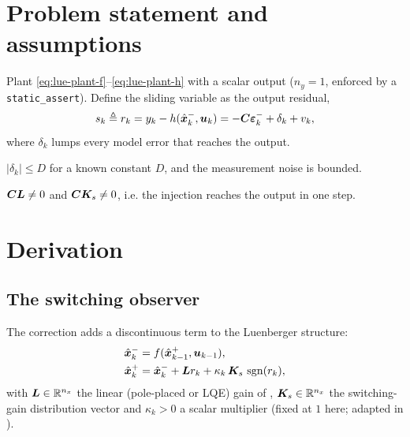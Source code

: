 \section{Problem statement and assumptions}
Plant \eqref{eq:lue-plant-f}--\eqref{eq:lue-plant-h} with a scalar output ($n_y=1$, enforced by a
\texttt{static\_assert}).  Define the sliding variable as the output residual,
\begin{equation}
s_k \triangleq r_k = y_k - h(\hat{\bm{x}}^{-}_k,\bm{u}_k) = -\bm{C}\bm{\varepsilon}^-_k + \delta_k + v_k ,
\label{eq:smo-s}
\end{equation}
where $\delta_k$ lumps every model error that reaches the output.
\begin{assumption}\label{as:smo-bound}
$|\delta_k| \le D$ for a known constant $D$, and the measurement noise is bounded.
\end{assumption}
\begin{assumption}\label{as:smo-reldeg}
$\bm{C}\bm{L} \neq 0$ and $\bm{C} \bm{K}_s \neq 0$, i.e. the injection reaches the output in one step.
\end{assumption}

\section{Derivation}

\subsection{The switching observer}
The correction adds a discontinuous term to the Luenberger structure:
\begin{align}
\hat{\bm{x}}^{-}_k &= f(\hat{\bm{x}}^{+}_{k-1},\bm{u}_{k-1}) , \label{eq:smo-pred}\\
\hat{\bm{x}}^{+}_k  &= \hat{\bm{x}}^{-}_k + \bm{L} r_k + \kappa_k\,\bm{K}_s\,\operatorname{sgn}(r_k) ,\label{eq:smo-ideal}
\end{align}
with $\bm{L}\in\mathbb{R}^{n_x}$ the linear (pole-placed or LQE) gain of ,
$\bm{K}_s\in\mathbb{R}^{n_x}$ the switching-gain distribution vector and $\kappa_k>0$ a scalar
multiplier (fixed at $1$ here; adapted in ).

